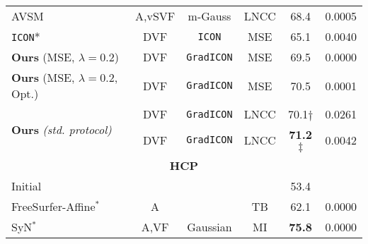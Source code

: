 \begin{table}[htp]
\begin{small}
{\begin{tabular}{lccccc}
				AVSM~\cite{shen2019networks}                              & A,vSVF               & m-Gauss                               & LNCC    & 68.4\resTS                  & 0.0005                  \\ %
				\texttt{ICON}*~\cite{greer2021icon}                       & DVF                  & \texttt{ICON}                         & MSE     & 65.1\resTS                  & 0.0040                  \\ %
				{\textbf{Ours} (MSE, $\lambda{=}0.2$)}                    & DVF                  & \cellcolor{black!10}\texttt{GradICON} & MSE     & 69.5\resTS                  & 0.0000                  \\ %
				{\textbf{Ours} (MSE, $\lambda{=}0.2$, Opt.)}              & DVF                  & \cellcolor{black!10}\texttt{GradICON} & MSE     & 70.5\resTS                  & 0.0001                  \\ %
				\multirow{2}{*}{\textbf{Ours} \emph{(std. protocol)}}     & DVF                  & \cellcolor{black!10}\texttt{GradICON} & LNCC    & 70.1$\dagger$               & 0.0261                  \\ %
				                                                          & DVF                  & \cellcolor{black!10}\texttt{GradICON} & LNCC    & {\bf 71.2}$\ddagger$        & 0.0042                  \\
				\midrule
				\multicolumn{6}{c}{\cellcolor{blue!10}\bf HCP}                                                                                                                                             \\
				Initial                                                   &                      &                                       &         & 53.4\resTS                 &                         \\
				\midrule
				FreeSurfer-Affine$^\ast$~\cite{reuter2010highly}          & A                    & \textemdash                           & TB      & 62.1\resTS                 & 0.0000                  \\
				SyN$^\ast$~\cite{avants2008symmetric}                     & A,VF                 & Gaussian                              & MI      & {\bf 75.8}\resTS            & 0.0000                  \\ \hline

\end{tabular}}
\end{small}
\end{table}
